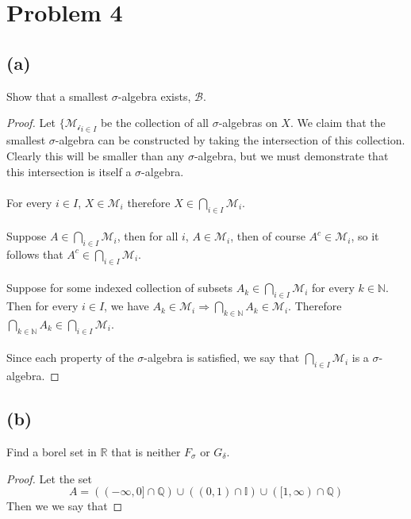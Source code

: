 \documentclass{article}
\theoremstyle{definition}
\begin{document}
\section*{Problem 4}
\subsection*{(a)}
\begin{mdframed}
    Show that a smallest $\sigma$-algebra exists, $\mathcal{B}$.
\end{mdframed}
\begin{proof}
    Let $\{\mathcal{M_i}_{i \in I}$ be the collection of all $\sigma$-algebras on $X$. We claim
    that the smallest $\sigma$-algebra can be constructed by taking the intersection of this collection.
    Clearly this will be smaller than any $\sigma$-algebra, but we must demonstrate that this intersection
    is itself a $\sigma$-algebra.\\\\
     For every $i \in I$, $X \in \mathcal{M}_i$ therefore $X \in \bigcap_{i \in I}\mathcal{M}_i$.\\\\
     Suppose $A \in \bigcap_{i \in I}\mathcal{M}_i$, then for all $i$, $A \in \mathcal{M}_i$, then of course $A^c \in \mathcal{M}_i$, 
    so it follows that $A^c \in \bigcap_{i \in I}\mathcal{M}_i$.\\\\
     Suppose for some indexed collection of subsets $A_k \in \bigcap_{i \in I} \mathcal{M}_i$ for every $k \in \mathbb{N}$.
    Then for every $i \in I$, we have $A_k \in \mathcal{M}_i \Longrightarrow \bigcap_{k \in \mathbb{N}}A_k \in \mathcal{M}_i$.
    Therefore $\bigcap_{k \in \mathbb{N}}A_k \in \bigcap_{i \in I}\mathcal{M}_i$.\\\\
    Since each property of the $\sigma$-algebra is satisfied, we say that $\bigcap_{i \in I}\mathcal{M}_i$ is a $\sigma$-algebra.
\end{proof}
\subsection*{(b)}
\begin{mdframed}
Find a borel set in $\mathbb{R}$ that is neither $F_\sigma$ or $G_\delta$.
\end{mdframed}
\begin{proof}
    Let the set
    \[ A = ((-\infty, 0] \cap \mathbb{Q}) \cup ((0,1) \cap \mathbb{I}) \cup ([1,\infty) \cap \mathbb{Q}) \]
    Then we we say that
\end{proof}
\end{document}

